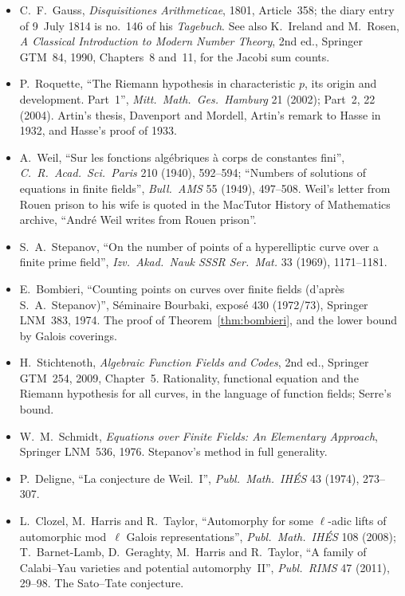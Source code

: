 \begin{itemize}
\item C.~F.~Gauss, \emph{Disquisitiones Arithmeticae}, 1801, Article~358; the diary entry of 9~July 1814 is no.~146 of his \emph{Tagebuch}. See also K.~Ireland and
M.~Rosen, \emph{A Classical Introduction to Modern Number Theory}, 2nd ed., Springer GTM~84, 1990, Chapters~8 and~11, for the Jacobi sum counts.
\item P.~Roquette, ``The Riemann hypothesis in characteristic $p$, its origin and development. Part~1'', \emph{Mitt.\ Math.\ Ges.\ Hamburg} 21 (2002); Part~2, 22 (2004).
Artin's thesis, Davenport and Mordell, Artin's remark to Hasse in 1932, and Hasse's proof of 1933.
\item A.~Weil, ``Sur les fonctions alg\'ebriques \`a corps de constantes fini'', \emph{C.\ R.\ Acad.\ Sci.\ Paris} 210 (1940), 592--594; ``Numbers of solutions of
equations in finite fields'', \emph{Bull.\ AMS} 55 (1949), 497--508. Weil's letter from Rouen prison to his wife is quoted in the MacTutor History of Mathematics
archive, ``Andr\'e Weil writes from Rouen prison''.
\item S.~A.~Stepanov, ``On the number of points of a hyperelliptic curve over a finite prime field'', \emph{Izv.\ Akad.\ Nauk SSSR Ser.\ Mat.} 33 (1969), 1171--1181.
\item E.~Bombieri, ``Counting points on curves over finite fields (d'apr\`es S.~A.~Stepanov)'', S\'eminaire Bourbaki, expos\'e 430 (1972/73), Springer LNM~383, 1974.
The proof of Theorem~\ref{thm:bombieri}, and the lower bound by Galois coverings.
\item H.~Stichtenoth, \emph{Algebraic Function Fields and Codes}, 2nd ed., Springer GTM~254, 2009, Chapter~5. Rationality, functional equation and the Riemann
hypothesis for all curves, in the language of function fields; Serre's bound.
\item W.~M.~Schmidt, \emph{Equations over Finite Fields: An Elementary Approach}, Springer LNM~536, 1976. Stepanov's method in full generality.
\item P.~Deligne, ``La conjecture de Weil.~I'', \emph{Publ.\ Math.\ IH\'ES} 43 (1974), 273--307.
\item L.~Clozel, M.~Harris and R.~Taylor, ``Automorphy for some $\ell$-adic lifts of automorphic mod~$\ell$ Galois representations'', \emph{Publ.\ Math.\ IH\'ES} 108 (2008);
T.~Barnet-Lamb, D.~Geraghty, M.~Harris and R.~Taylor, ``A family of Calabi--Yau varieties and potential automorphy~II'', \emph{Publ.\ RIMS} 47 (2011), 29--98.
The Sato--Tate conjecture.
\end{itemize}
